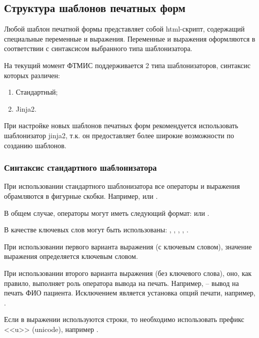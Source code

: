\subsection{Структура шаблонов печатных форм}

Любой шаблон печатной формы представляет собой html-скрипт, содержащий специальные переменные и выражения. Переменные и выражения оформляются в соответствии с синтаксисом выбранного типа шаблонизатора.

На текущий момент ФТМИС поддерживается 2 типа шаблонизаторов, синтаксис которых различен:
\begin{enumerate}
 \item Стандартный;
 \item Jinja2.
\end{enumerate}
 
При настройке новых шаблонов печатных форм рекомендуется использовать шаблонизатор jinja2, т.к. он предоставляет более широкие возможности по созданию шаблонов.

\subsubsection{Синтаксис стандартного шаблонизатора}

При использовании стандартного шаблонизатора все операторы и выражения обрамляются в фигурные скобки. Например,  или .

В общем случае, операторы могут иметь следующий формат:
 или .

В качестве ключевых слов могут быть использованы: , , , , .

При использовании первого варианта выражения (с ключевым словом), значение выражения определяется ключевым словом.

При использовании второго варианта выражения (без ключевого слова), оно, как правило, выполняет роль оператора вывода на печать. Например,  – вывод на печать ФИО пациента. Исключением является установка опций печати, например, .

Если в выражении используются строки, то необходимо использовать префикс <<u>> (unicode), например .


